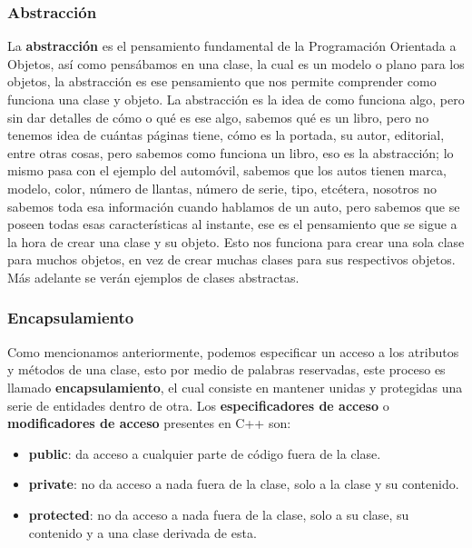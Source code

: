 \subsubsection{Abstracción}

La \textbf{abstracción} es el pensamiento fundamental de la Programación Orientada a Objetos, así como pensábamos en una clase, la cual es un modelo o plano para los objetos, la abstracción es ese pensamiento que nos permite comprender como funciona una clase y objeto. La abstracción es la idea de como funciona algo, pero sin dar detalles de cómo o qué es ese algo, sabemos qué es un libro, pero no tenemos idea de cuántas páginas tiene, cómo es la portada, su autor, editorial, entre otras cosas, pero sabemos como funciona un libro, eso es la abstracción; lo mismo pasa con el ejemplo del automóvil, sabemos que los autos tienen marca, modelo, color, número de llantas, número de serie, tipo, etcétera, nosotros no sabemos toda esa información cuando hablamos de un auto, pero sabemos que se poseen todas esas características al instante, ese es el pensamiento que se sigue a la hora de crear una clase y su objeto. Esto nos funciona para crear una sola clase para muchos objetos, en vez de crear muchas clases para sus respectivos objetos. Más adelante se verán ejemplos de clases abstractas.


\subsubsection{Encapsulamiento}

Como mencionamos anteriormente, podemos especificar un acceso a los atributos y métodos de una clase, esto por medio de palabras reservadas, este proceso es llamado \textbf{encapsulamiento}, el cual consiste en mantener unidas y protegidas una serie de entidades dentro de otra. Los \textbf{especificadores de acceso} o \textbf{modificadores de acceso} presentes en C++ son:
\begin{itemize}
    \item \textbf{public}: da acceso a cualquier parte de código fuera de la clase.
    \item \textbf{private}: no da acceso a nada fuera de la clase, solo a la clase y su contenido.
    \item \textbf{protected}: no da acceso a nada fuera de la clase, solo a su clase, su contenido y a una clase derivada de esta.
\end{itemize}

